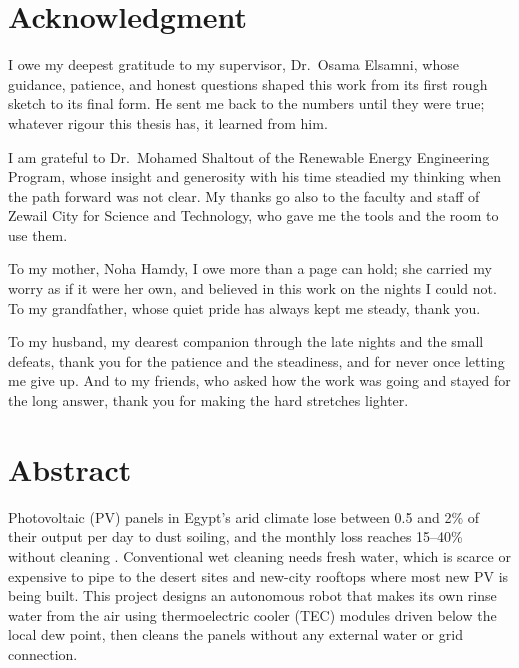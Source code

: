 \documentclass[12pt,a4paper]{report}   %
\begin{document}
\chapter*{Acknowledgment}
\thispagestyle{plain}

I owe my deepest gratitude to my supervisor, Dr.\ Osama Elsamni, whose guidance,
patience, and honest questions shaped this work from its first rough sketch to its
final form. He sent me back to the numbers until they were true; whatever rigour
this thesis has, it learned from him.

I am grateful to Dr.\ Mohamed Shaltout of the Renewable Energy Engineering Program,
whose insight and generosity with his time steadied my thinking when the path
forward was not clear. My thanks go also to the faculty and staff of Zewail City for
Science and Technology, who gave me the tools and the room to use them.

To my mother, Noha Hamdy, I owe more than a page can hold; she carried my worry as
if it were her own, and believed in this work on the nights I could not. To my
grandfather, whose quiet pride has always kept me steady, thank you.

To my husband, my dearest companion through the late nights and the small defeats,
thank you for the patience and the steadiness, and for never once letting me give
up. And to my friends, who asked how the work was going and stayed for the long
answer, thank you for making the hard stretches lighter.

\chapter*{Abstract}
\thispagestyle{plain}

Photovoltaic (PV) panels in Egypt's arid climate lose between 0.5 and 2\% of their
output per day to dust soiling, and the monthly loss reaches 15--40\% without
cleaning \cite{kazem2023soiling,sarver2013pvsoiling}. Conventional wet cleaning needs
fresh water, which is scarce or expensive to pipe to the desert sites and new-city
rooftops where most new PV is being built. This project designs an autonomous robot
that makes its own rinse water from the air using thermoelectric cooler (TEC) modules
driven below the local dew point, then cleans the panels without any external water
or grid connection.
\end{document}
